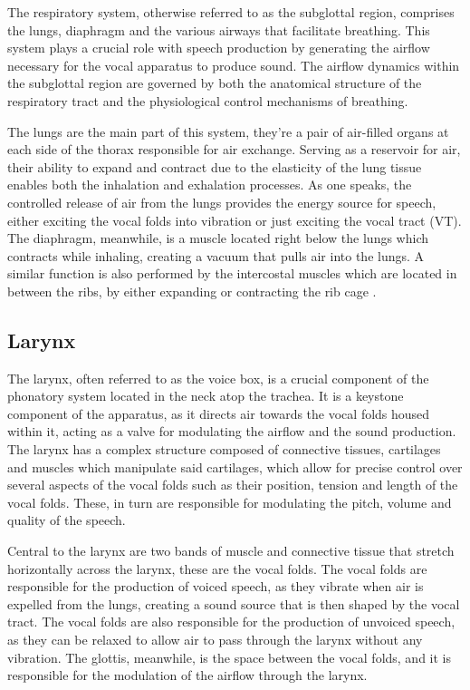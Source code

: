 The respiratory system, otherwise referred to as the subglottal region, comprises the lungs, diaphragm and the various airways that facilitate breathing. This system plays a crucial role with speech production by generating the airflow necessary for the vocal apparatus to produce sound. The airflow dynamics within the subglottal region are governed by both the anatomical structure of the respiratory tract and the physiological control mechanisms of breathing.

The lungs are the main part of this system, they're a pair of air-filled organs at each side of the thorax responsible for air exchange. Serving as a reservoir for air, their ability to expand and contract due to the elasticity of the lung tissue enables both the inhalation and exhalation processes. As one speaks, the controlled release of air from the lungs provides the energy source for speech, either exciting the vocal folds into vibration or just exciting the vocal tract (VT). The diaphragm, meanwhile, is a muscle located right below the lungs which contracts while inhaling, creating a vacuum that pulls air into the lungs. A similar function is also performed by the intercostal muscles which are located in between the ribs, by either expanding or contracting the rib cage \cite{zhangMechanicsHumanVoice2016}. 

\subsection{Larynx}

The larynx, often referred to as the voice box, is a crucial component of the phonatory system located in the neck atop the trachea. It is a keystone component of the apparatus, as it directs air towards the vocal folds housed within it, acting as a valve for modulating the airflow and the sound production. The larynx has a complex structure composed of connective tissues, cartilages and muscles which manipulate said cartilages, which allow for precise control over several aspects of the vocal folds such as their position, tension and length of the vocal folds. These, in turn are responsible for modulating the pitch, volume and quality of the speech.

Central to the larynx are two bands of muscle and connective tissue that stretch horizontally across the larynx, these are the vocal folds. The vocal folds are responsible for the production of voiced speech, as they vibrate when air is expelled from the lungs, creating a sound source that is then shaped by the vocal tract. The vocal folds are also responsible for the production of unvoiced speech, as they can be relaxed to allow air to pass through the larynx without any vibration. The glottis, meanwhile, is the space between the vocal folds, and it is responsible for the modulation of the airflow through the larynx.

